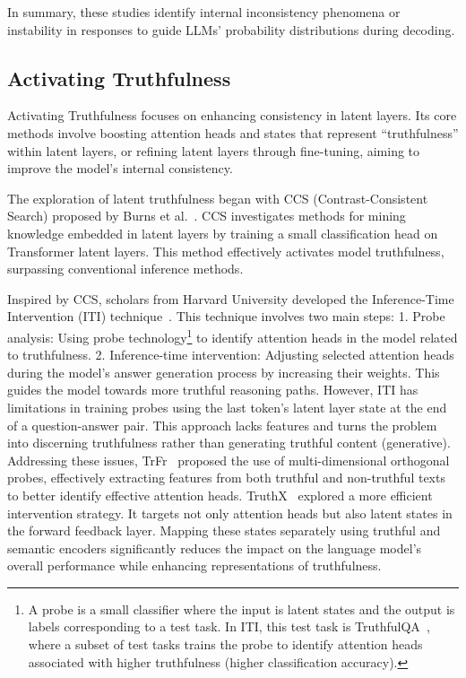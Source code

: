\documentclass[lettersize,journal]{IEEEtran}
\begin{document}
In summary, these studies identify internal inconsistency phenomena or instability in responses to guide LLMs' probability distributions during decoding.


\subsection{Activating Truthfulness} \label{sec:activate_truth}


\noindent  Activating Truthfulness focuses on enhancing consistency in latent layers. Its core methods involve boosting attention heads and states that represent ``truthfulness'' within latent layers, or refining latent layers through fine-tuning, aiming to improve the model's internal consistency.

The exploration of latent truthfulness began with CCS (Contrast-Consistent Search) proposed by Burns et al.~\cite{CCS_23_ICLR_UCB}. CCS investigates methods for mining knowledge embedded in latent layers by training a small classification head on Transformer latent layers. This method effectively activates model truthfulness, surpassing conventional inference methods.

Inspired by CCS, scholars from Harvard University developed the Inference-Time Intervention (ITI) technique~\cite{ITI_23_NeuIPS_Harvard}. This technique involves two main steps: 1. Probe analysis: Using probe technology\footnote{A probe is a small classifier where the input is latent states and the output is labels corresponding to a test task. In ITI, this test task is TruthfulQA~\cite{lin-etal-2022-truthfulqa}, where a subset of test tasks trains the probe to identify attention heads associated with higher truthfulness (higher classification accuracy).} to identify attention heads in the model related to truthfulness. 2. Inference-time intervention: Adjusting selected attention heads during the model's answer generation process by increasing their weights. This guides the model towards more truthful reasoning paths. However, ITI has limitations in training probes using the last token's latent layer state at the end of a question-answer pair. This approach lacks features and turns the problem into discerning truthfulness rather than generating truthful content (generative). Addressing these issues, TrFr~\cite{TrFr_24_AAAI_BUAA} proposed the use of multi-dimensional orthogonal probes, effectively extracting features from both truthful and non-truthful texts to better identify effective attention heads. TruthX~\cite{TruthX_24_ACL_ICT} explored a more efficient intervention strategy. It targets not only attention heads but also latent states in the forward feedback layer. Mapping these states separately using truthful and semantic encoders significantly reduces the impact on the language model's overall performance while enhancing representations of truthfulness.
\end{document}
